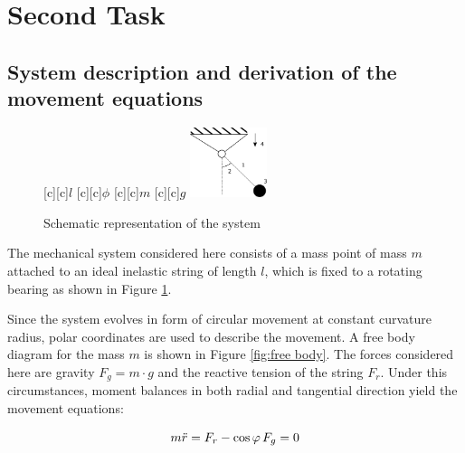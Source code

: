 \documentclass[12pt,bibstyle=none,pagenumberinfooter]{ifmdocument}
\begin{document}
\section{Second Task}

\subsection{System description and derivation of the movement equations}


\begin{figure}[h]
  \begin{center}
    {
        \psfragscanon
      [c][c]{$l$}
      [c][c]{$\phi$}
      [c][c]{$m$}
      [c][c]{$g$}
      \includegraphics[width=0.2\textwidth]{Figures/Zeichnung-1.eps}}
  \end{center}
  \caption{Schematic representation of the system}
  \label{fig:skizze}
\end{figure}


%    



The mechanical system considered here consists of a mass point of mass $m$ attached to an ideal inelastic string of length $l$, which is fixed to a rotating bearing as shown in Figure \ref{fig:skizze}.


Since the system evolves in form of circular movement at constant curvature radius, polar coordinates are used to describe the movement. A free body diagram for the mass $m$ is shown in Figure \ref{fig:free body}. The forces considered here are gravity $F_g = m\cdot g$ and the reactive tension of the string $F_r$. Under this circumstances, moment balances in both radial and tangential direction yield the movement equations:

\begin{equation}
\label{eq: radialbalance}
    m \Ddot{r} = F_r - \cos{\phi}\,F_g = 0
\end{equation}
\end{document}
